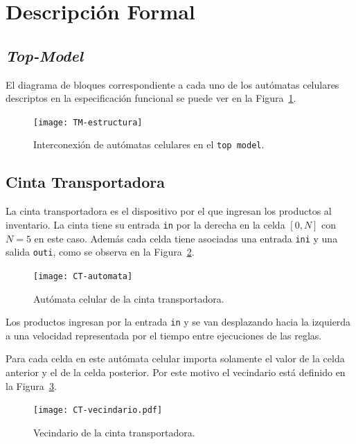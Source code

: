 \documentclass[10pt]{article}
\begin{document}
\section{Descripción Formal}

\subsection{\textit{Top-Model}}
El diagrama de bloques correspondiente a cada uno de los autómatas celulares descriptos en la especificación funcional se puede ver en la Figura~\ref{fig:TM-estructura}.

\begin{figure}[h] 
	\centering 
	\texttt{[image: TM-estructura]} 
	\caption{Interconexión de autómatas celulares en el \texttt{top model}.} 
	\label{fig:TM-estructura} 
\end{figure}

\subsection{Cinta Transportadora}\label{sec:CT}

La cinta transportadora es el dispositivo por el que ingresan los productos al inventario. La cinta tiene su entrada \texttt{in} por la derecha en la celda $[0,N]$ con $N=5$ en este caso. Además cada celda tiene asociadas una entrada \texttt{ini} y una salida \texttt{outi}, como se observa en la Figura~\ref{fig:CT-automata}. 

\begin{figure}[h] 
  \centering 
  \texttt{[image: CT-automata]} 
  \caption{Autómata celular de la cinta transportadora.} 
  \label{fig:CT-automata} 
\end{figure}
\FloatBarrier


Los productos ingresan por la entrada \texttt{in} y se van desplazando hacia la izquierda a una velocidad representada por el tiempo entre ejecuciones de las reglas.

Para cada celda en este autómata celular importa solamente el valor de la celda anterior y el de la celda posterior. Por este motivo el vecindario está definido en la Figura~\ref{fig:CT-vecindario}.

\begin{figure}[h] 
  \centering 
  \texttt{[image: CT-vecindario.pdf]} 
  \caption{Vecindario de la cinta transportadora.} 
  \label{fig:CT-vecindario} 
\end{figure}
\FloatBarrier
\end{document}
